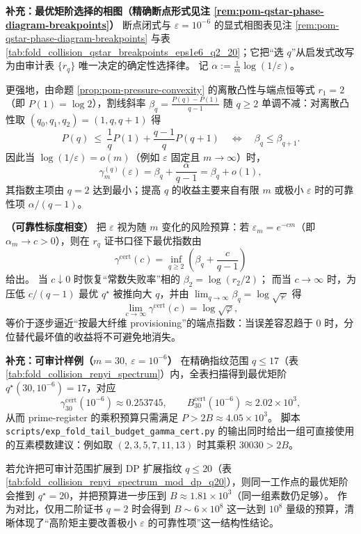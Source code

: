\begin{remark}
\medskip\noindent\textbf{补充：最优矩阶选择的相图（精确断点形式见注 \ref{rem:pom-qstar-phase-diagram-breakpoints}）}
断点闭式与 \(\varepsilon=10^{-6}\) 的显式相图表见注 \ref{rem:pom-qstar-phase-diagram-breakpoints} 与表 \ref{tab:fold_collision_qstar_breakpoints_eps1e6_q2_20}；它把“选 \(q\)”从启发式改写为由审计表 \(\{r_q\}\) 唯一决定的确定性选择律。
记 \(\alpha:=\frac{1}{m}\log(1/\varepsilon)\)。

更强地，由命题 \ref{prop:pom-pressure-convexity} 的离散凸性与端点恒等式 \(r_1=2\)（即 \(P(1)=\log 2\)），割线斜率
\(
\beta_q=\frac{P(q)-P(1)}{q-1}
\)
随 \(q\ge 2\) 单调不减：对离散凸性取 \((q_0,q_1,q_2)=(1,q,q+1)\) 得
\[
P(q)\ \le\ \frac{1}{q}P(1)+\frac{q-1}{q}P(q+1)
\quad\Longleftrightarrow\quad
\beta_q\le \beta_{q+1}.
\]
因此当 \(\log(1/\varepsilon)=o(m)\)（例如 \(\varepsilon\) 固定且 \(m\to\infty\)）时，
\[
\gamma_m^{(q)}(\varepsilon)=\beta_q+\frac{\alpha}{q-1}=\beta_q+o(1),
\]
其指数主项由 \(q=2\) 达到最小；提高 \(q\) 的收益主要来自有限 \(m\) 或极小 \(\varepsilon\) 时的可靠性项 \(\alpha/(q-1)\)。

\medskip\noindent\textbf{（可靠性标度相变）}
把 \(\varepsilon\) 视为随 \(m\) 变化的风险预算：若 \(\varepsilon_m=e^{-c m}\)（即 \(\alpha_m\to c>0\)），则在 \(r_q\) 证书口径下最优指数由
\[
\gamma^{\mathrm{cert}}(c)
=\inf_{q\ge 2}\left(\beta_q+\frac{c}{q-1}\right)
\]
给出。
当 \(c\downarrow 0\) 时恢复“常数失败率”相的 \(\beta_2=\log(r_2/2)\)；
而当 \(c\to\infty\) 时，为压低 \(c/(q-1)\) 最优 \(q^\star\) 被推向大 \(q\)，并由 \(\lim_{q\to\infty}\beta_q=\log\sqrt{\varphi}\) 得
\[
\lim_{c\to\infty}\gamma^{\mathrm{cert}}(c)=\log\sqrt{\varphi},
\]
等价于逐步逼近“按最大纤维 provisioning”的端点指数：当误差容忍趋于 0 时，分位替代最坏值的收益将不可避免地消失。

\medskip\noindent\textbf{补充：可审计样例（\(m=30,\ \varepsilon=10^{-6}\)）}
在精确指纹范围 \(q\le 17\)（表 \ref{tab:fold_collision_renyi_spectrum}）内，全表扫描得到最优矩阶 \(q^\star(30,10^{-6})=17\)，对应
\[
\gamma^{\mathrm{cert}}_{30}(10^{-6})\approx 0.253745,\qquad
B^{\mathrm{cert}}_{30}(10^{-6})\approx 2.02\times 10^3,
\]
从而 prime-register 的乘积预算只需满足 \(P>2B\approx 4.05\times 10^3\)。
脚本 \texttt{scripts/exp\_fold\_tail\_budget\_gamma\_cert.py} 的输出同时给出一组可直接使用的互素模数建议：例如取 \((2,3,5,7,11,13)\) 时其乘积 \(30030>2B\)。
\par
若允许把可审计范围扩展到 DP 扩展指纹 \(q\le 20\)（表 \ref{tab:fold_collision_renyi_spectrum_mod_dp_q20}），则同一工作点的最优矩阶会推到 \(q^\star=20\)，并把预算进一步压到 \(B\approx 1.81\times 10^3\)（同一组素数仍足够）。
作为对比，仅用二阶证书 \(q=2\) 时会得到 \(B\sim 6\times 10^8\) 这一达到 $10^8$ 量级的预算，清晰体现了“高阶矩主要改善极小 \(\varepsilon\) 的可靠性项”这一结构性结论。


\end{remark}
